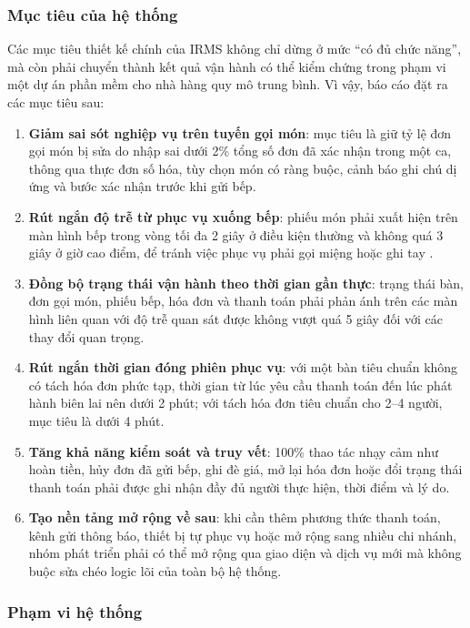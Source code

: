 \documentclass[11pt,a4paper]{article}
\begin{document}
\subsubsection{Mục tiêu của hệ thống}
Các mục tiêu thiết kế chính của IRMS không chỉ dừng ở mức \enquote{có đủ chức năng}, mà còn phải chuyển thành kết quả vận hành có thể kiểm chứng trong phạm vi một dự án phần mềm cho nhà hàng quy mô trung bình. Vì vậy, báo cáo đặt ra các mục tiêu sau:
\begin{enumerate}
    \item \textbf{Giảm sai sót nghiệp vụ trên tuyến gọi món}: mục tiêu là giữ tỷ lệ đơn gọi món bị sửa do nhập sai dưới 2\% tổng số đơn đã xác nhận trong một ca, thông qua thực đơn số hóa, tùy chọn món có ràng buộc, cảnh báo ghi chú dị ứng và bước xác nhận trước khi gửi bếp.
    \item \textbf{Rút ngắn độ trễ từ phục vụ xuống bếp}: phiếu món phải xuất hiện trên màn hình bếp trong vòng tối đa 2 giây ở điều kiện thường và không quá 3 giây ở giờ cao điểm, để tránh việc phục vụ phải gọi miệng hoặc ghi tay .
    \item \textbf{Đồng bộ trạng thái vận hành theo thời gian gần thực}: trạng thái bàn, đơn gọi món, phiếu bếp, hóa đơn và thanh toán phải phản ánh trên các màn hình liên quan với độ trễ quan sát được không vượt quá 5 giây đối với các thay đổi quan trọng.
    \item \textbf{Rút ngắn thời gian đóng phiên phục vụ}: với một bàn tiêu chuẩn không có tách hóa đơn phức tạp, thời gian từ lúc yêu cầu thanh toán đến lúc phát hành biên lai nên dưới 2 phút; với tách hóa đơn tiêu chuẩn cho 2--4 người, mục tiêu là dưới 4 phút.
    \item \textbf{Tăng khả năng kiểm soát và truy vết}: 100\% thao tác nhạy cảm như hoàn tiền, hủy đơn đã gửi bếp, ghi đè giá, mở lại hóa đơn hoặc đổi trạng thái thanh toán phải được ghi nhận đầy đủ người thực hiện, thời điểm và lý do.
    \item \textbf{Tạo nền tảng mở rộng về sau}: khi cần thêm phương thức thanh toán, kênh gửi thông báo, thiết bị tự phục vụ hoặc mở rộng sang nhiều chi nhánh, nhóm phát triển phải có thể mở rộng qua giao diện và dịch vụ mới mà không buộc sửa chéo logic lõi của toàn bộ hệ thống.
\end{enumerate}

\subsubsection{Phạm vi hệ thống}
\end{document}
